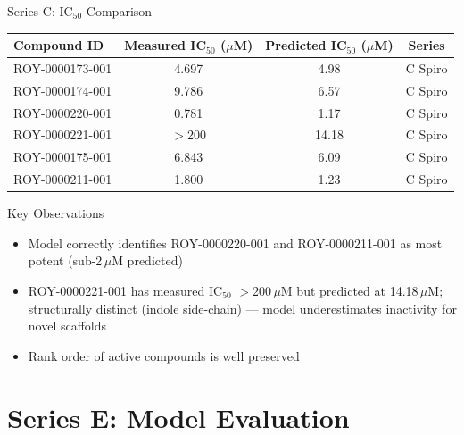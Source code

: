 \documentclass[aspectratio=169]{beamer}
\begin{document}
\begin{frame}{Series C: IC$_{50}$ Comparison}
  \centering
  \small
  \begin{tabular}{lccc}
    \toprule
    \textbf{Compound ID} & \textbf{Measured IC$_{50}$ ($\mu$M)} & \textbf{Predicted IC$_{50}$ ($\mu$M)} & \textbf{Series} \\
    \midrule
    ROY-0000173-001 & 4.697  & 4.98  & C Spiro \\
    ROY-0000174-001 & 9.786  & 6.57  & C Spiro \\
    ROY-0000220-001 & 0.781  & 1.17  & C Spiro \\
    ROY-0000221-001 & $>$200 & 14.18 & C Spiro \\
    ROY-0000175-001 & 6.843  & 6.09  & C Spiro \\
    ROY-0000211-001 & 1.800  & 1.23  & C Spiro \\
    \bottomrule
  \end{tabular}
  \vspace{0.7em}

  \begin{block}{Key Observations}
    \small
    \begin{itemize}
      \item Model correctly identifies ROY-0000220-001 and ROY-0000211-001 as most potent (sub-2\,$\mu$M predicted)
      \item ROY-0000221-001 has measured IC$_{50}$ $>$200\,$\mu$M but predicted at 14.18\,$\mu$M; structurally distinct (indole side-chain) --- model underestimates inactivity for novel scaffolds
      \item Rank order of active compounds is well preserved
    \end{itemize}
  \end{block}
\end{frame}

\section{Series E: Model Evaluation}
\end{document}
